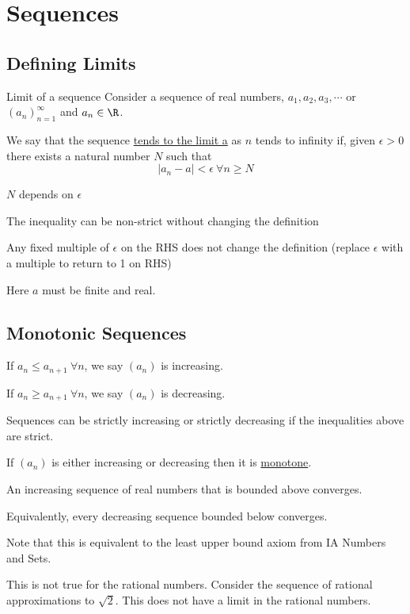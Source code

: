 \documentclass[../Main.tex]{subfiles}
\begin{document}
\section{Sequences}
\subsection{Defining Limits}
\begin{definition}{Limit of a sequence}
    Consider a sequence of real numbers, $a_1, a_2, a_3, \cdots$ or $(a_n)_{n=1}^\infty$ and $a_n \in \R$.\par
    We say that the sequence \underline{tends to the limit a} as $n$ tends to infinity if, given $\epsilon > 0$ there exists a natural number $N$ such that
    \begin{equation}
        |a_n - a| < \epsilon~\forall n \geq N
        \label{eqnSequenceConvergence}
    \end{equation}
\end{definition}
\begin{remarks}
    \item $N$ depends on $\epsilon$
    \item The inequality can be non-strict without changing the definition
    \item Any fixed multiple of $\epsilon$ on the RHS does not change the definition (replace $\epsilon$ with a multiple to return to 1 on RHS)
    \item Here $a$ must be finite and real.
\end{remarks}
\subsection{Monotonic Sequences}
If $a_n \leq a_{n+1}~\forall n$, we say $(a_n)$ is increasing.\par
If $a_n \geq a_{n+1}~\forall n$, we say $(a_n)$ is decreasing.\par
Sequences can be strictly increasing or strictly decreasing if the inequalities above are strict.\par
If $(a_n)$ is either increasing or decreasing then it is \underline{monotone}.\par
\begin{proposition}
    An increasing sequence of real numbers that is bounded above converges.
\end{proposition}
\begin{remarks}
    \item Equivalently, every decreasing sequence bounded below converges.
    \item Note that this is equivalent to the least upper bound axiom from IA Numbers and Sets.
    \item This is not true for the rational numbers. Consider the sequence of rational approximations to $\sqrt{2}$. This does not have a limit in the rational numbers.
\end{remarks}
\end{document}
